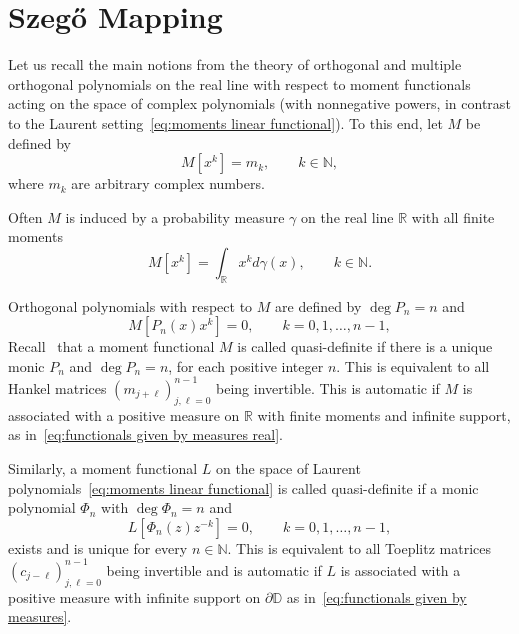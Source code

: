 \documentclass[reqno,centertags,11pt,draft]{amsart}
\newcommand{\R}{\mathbb{R}}
\newcommand{\N}{\mathbb{N}}
\newcommand{\T}{\mathbb{\partial\mathbb{D}}}
\begin{document}

\section{Szeg\H{o} Mapping}\label{ss:SzegoMap}

Let us recall the main notions from the theory of orthogonal and multiple orthogonal polynomials on the real line with respect to moment functionals acting on the space of complex polynomials 
(with nonnegative powers, in contrast to the Laurent setting~\eqref{eq:moments linear functional}). To this end, let $M$ be defined by
\begin{equation}\label{eq:moments linear functional real}
         M[x^{k}] = m_{k} , \qquad k\in\N, %
\end{equation}
where $m_{k}$ are arbitrary complex numbers. 

Often $M$ is induced by a probability measure $\gamma$ on the real line $\R$ with all finite moments
\begin{equation}\label{eq:functionals given by measures real}
        M[x^{k}] = \int_{\R} x^{k} d\gamma(x), \qquad 
        k \in \N. %
\end{equation}

Orthogonal polynomials with respect to $M$ are defined by $\deg P_n = n$ and 
$$
M[P_n(x) x^k] = 0, \qquad k=0,1,\ldots,n-1,
$$
Recall~\cite{Chihara} that a moment functional $M$ is called quasi-definite if there is a unique monic $P_n$ and $\deg{P_n} = n$, for each positive integer $n$. This is equivalent to all Hankel matrices $(m_{j+\ell})_{j,\ell=0}^{n-1}$ being invertible. This is automatic if $M$ is associated with a positive measure on $\R$ with finite moments and infinite support, as in~\eqref{eq:functionals given by measures real}.

Similarly, a moment functional $L$ on the space of Laurent polynomials~\eqref{eq:moments linear functional} is called quasi-definite if a monic polynomial $\Phi_n$ with $\deg \Phi_n = n$ and
$$
L[\Phi_n(z) z^{-k}] = 0, \qquad k=0,1,\ldots,n-1,
$$ 
exists and is unique for every $n\in\N$. This is equivalent to all Toeplitz matrices $(c_{j-\ell})_{j,\ell=0}^{n-1}$ being invertible and is automatic if $L$ is associated with a positive measure with infinite support on $\T$ as in~\eqref{eq:functionals given by measures}.
\end{document}
